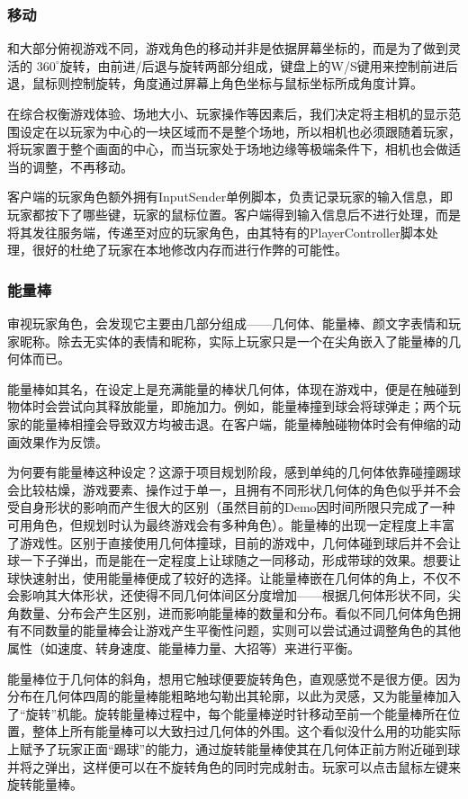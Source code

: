 \documentclass[conference]{IEEEtran}
\begin{document}
\subsubsection{移动}
\quad

和大部分俯视游戏不同，游戏角色的移动并非是依据屏幕坐标的，而是为了做到灵活的 $360^\circ$旋转，由前进/后退与旋转两部分组成，键盘上的W/S键用来控制前进后退，鼠标则控制旋转，角度通过屏幕上角色坐标与鼠标坐标所成角度计算。

在综合权衡游戏体验、场地大小、玩家操作等因素后，我们决定将主相机的显示范围设定在以玩家为中心的一块区域而不是整个场地，所以相机也必须跟随着玩家，将玩家置于整个画面的中心，而当玩家处于场地边缘等极端条件下，相机也会做适当的调整，不再移动。

客户端的玩家角色额外拥有InputSender单例脚本，负责记录玩家的输入信息，即玩家都按下了哪些键，玩家的鼠标位置。客户端得到输入信息后不进行处理，而是将其发往服务端，传递至对应的玩家角色，由其特有的PlayerController脚本处理，很好的杜绝了玩家在本地修改内存而进行作弊的可能性。

\subsubsection{能量棒}
\quad

审视玩家角色，会发现它主要由几部分组成——几何体、能量棒、颜文字表情和玩家昵称。除去无实体的表情和昵称，实际上玩家只是一个在尖角嵌入了能量棒的几何体而已。

能量棒如其名，在设定上是充满能量的棒状几何体，体现在游戏中，便是在触碰到物体时会尝试向其释放能量，即施加力。例如，能量棒撞到球会将球弹走；两个玩家的能量棒相撞会导致双方均被击退。在客户端，能量棒触碰物体时会有伸缩的动画效果作为反馈。

为何要有能量棒这种设定？这源于项目规划阶段，感到单纯的几何体依靠碰撞踢球会比较枯燥，游戏要素、操作过于单一，且拥有不同形状几何体的角色似乎并不会受自身形状的影响而产生很大的区别（虽然目前的Demo因时间所限只完成了一种可用角色，但规划时认为最终游戏会有多种角色）。能量棒的出现一定程度上丰富了游戏性。区别于直接使用几何体撞球，目前的游戏中，几何体碰到球后并不会让球一下子弹出，而是能在一定程度上让球随之一同移动，形成带球的效果。想要让球快速射出，使用能量棒便成了较好的选择。让能量棒嵌在几何体的角上，不仅不会影响其大体形状，还使得不同几何体间区分度增加——根据几何体形状不同，尖角数量、分布会产生区别，进而影响能量棒的数量和分布。看似不同几何体角色拥有不同数量的能量棒会让游戏产生平衡性问题，实则可以尝试通过调整角色的其他属性（如速度、转身速度、能量棒力量、大招等）来进行平衡。

能量棒位于几何体的斜角，想用它触球便要旋转角色，直观感觉不是很方便。因为分布在几何体四周的能量棒能粗略地勾勒出其轮廓，以此为灵感，又为能量棒加入了“旋转”机能。旋转能量棒过程中，每个能量棒逆时针移动至前一个能量棒所在位置，整体上所有能量棒可以大致扫过几何体的外围。这个看似没什么用的功能实际上赋予了玩家正面“踢球”的能力，通过旋转能量棒使其在几何体正前方附近碰到球并将之弹出，这样便可以在不旋转角色的同时完成射击。玩家可以点击鼠标左键来旋转能量棒。
\end{document}
